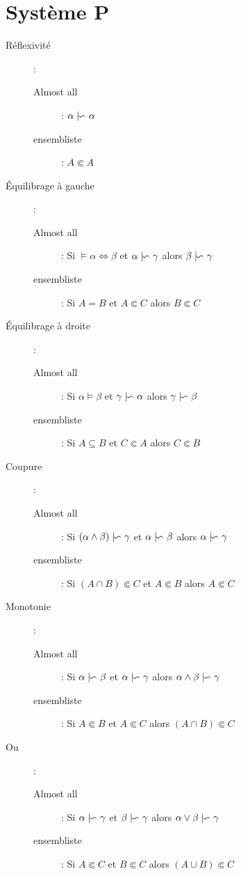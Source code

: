 \section{Système P}
\begin{description}
\item[Réflexivité]:
\begin{description}
\item[Almost all]: $\alpha \mid\kern-0.40em{\backsim}\  \alpha$
\item[ensembliste]: $A \Subset A$
\end{description}
\item[Équilibrage à gauche]:
\begin{description}
\item[Almost all]: Si $\models \alpha \Leftrightarrow \beta$ et $\alpha \mid\kern-0.40em{\backsim}\  \gamma$ alors $\beta \mid\kern-0.40em{\backsim}\  \gamma$
\item[ensembliste]: Si $A = B$ et $A \Subset C$ alors $B \Subset C$
\end{description}
\item[Équilibrage à droite]:
\begin{description}
\item[Almost all]: Si $\alpha \models \beta$ et $\gamma \mid\kern-0.40em{\backsim}\  \alpha$ alors $\gamma \mid\kern-0.40em{\backsim}\  \beta$
\item[ensembliste]: Si $A \subseteq B$ et $C \Subset A$ alors $C \Subset B$
\end{description}
\item[Coupure]:
\begin{description}
\item[Almost all]: Si $(\alpha \wedge \beta) \mid\kern-0.40em{\backsim}\  \gamma$ et $\alpha \mid\kern-0.40em{\backsim}\  \beta$ alors $\alpha \mid\kern-0.40em{\backsim}\  \gamma$
\item[ensembliste]: Si $(A \cap B) \Subset C$ et $A \Subset B$ alors $A \Subset C$
\end{description}
\item[Monotonie]:
\begin{description}
\item[Almost all]: Si $\alpha \mid\kern-0.40em{\backsim}\  \beta$ et $\alpha \mid\kern-0.40em{\backsim}\  \gamma$ alors $\alpha \wedge \beta \mid\kern-0.40em{\backsim}\  \gamma$
\item[ensembliste]: Si $A \Subset B$ et $A \Subset C$ alors $(A \cap B) \Subset C$
\end{description}
\item[Ou]:
\begin{description}
\item[Almost all]: Si $\alpha \mid\kern-0.40em{\backsim}\  \gamma$ et $\beta \mid\kern-0.40em{\backsim}\  \gamma$ alors $\alpha \vee \beta \mid\kern-0.40em{\backsim}\  \gamma$
\item[ensembliste]: Si $A \Subset C$ et $B \Subset C$ alors $(A \cup B) \Subset C$
\end{description}
\end{description}
\pagebreak
